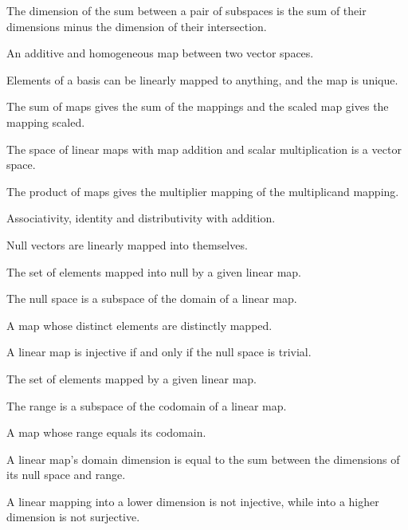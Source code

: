 \begin{multicols}{3}
  The dimension of the sum between a pair of subspaces is the sum of their dimensions minus the dimension of their intersection.

  An additive and homogeneous map between two vector spaces.

  Elements of a basis can be linearly mapped to anything, and the map is unique.

  The sum of maps gives the sum of the mappings and the scaled map gives the mapping scaled.
  
  The space of linear maps with map addition and scalar multiplication is a vector space.

  The product of maps gives the multiplier mapping of the multiplicand mapping.

  Associativity, identity and distributivity with addition.

  Null vectors are linearly mapped into themselves.

  The set of elements mapped into null by a given linear map.

  The null space is a subspace of the domain of a linear map.

  A map whose distinct elements are distinctly mapped.

  A linear map is injective if and only if the null space is trivial.

  The set of elements mapped by a given linear map.

  The range is a subspace of the codomain of a linear map.

  A map whose range equals its codomain.

  A linear map's domain dimension is equal to the sum between the dimensions of its null space and range.

  A linear mapping into a lower dimension is not injective, while into a higher dimension is not surjective.


\end{multicols}
